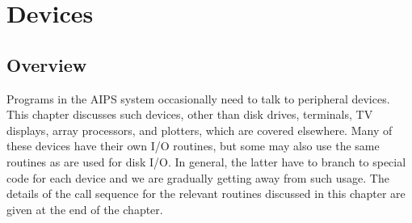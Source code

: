 \setcounter{chapter}{8} %
\chapter{Devices}
\section{Overview}
Programs in the AIPS system occasionally need to talk to peripheral
devices.  This chapter discusses such devices, other than disk drives,
terminals, TV displays, array processors, and plotters, which are
covered elsewhere.  Many of these devices have their own I/O routines,
but some may also use the same routines as are used for disk I/O. In
general, the latter have to branch to special code for each device and
we are gradually getting away from such usage.  The details of the
call sequence for the relevant routines discussed in this chapter are
given at the end of the chapter.

